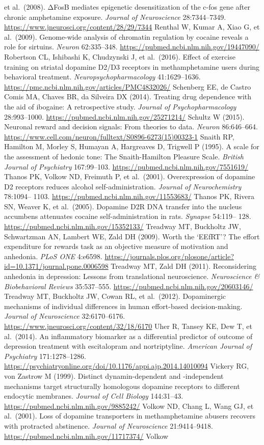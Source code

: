 et al.~(2008). ΔFosB mediates epigenetic desensitization of the c-fos gene after chronic amphetamine exposure. \emph{Journal of Neuroscience} 28:7344--7349. \url{https://www.jneurosci.org/content/28/29/7344} Renthal W, Kumar A, Xiao G, et al.~(2009). Genome-wide analysis of chromatin regulation by cocaine reveals a role for sirtuins. \emph{Neuron} 62:335--348. \url{https://pubmed.ncbi.nlm.nih.gov/19447090/} Robertson CL, Ishibashi K, Chudzynski J, et al.~(2016). Effect of exercise training on striatal dopamine D2/D3 receptors in methamphetamine users during behavioral treatment. \emph{Neuropsychopharmacology} 41:1629--1636. \url{https://pmc.ncbi.nlm.nih.gov/articles/PMC4832026/} Schenberg EE, de Castro Comis MA, Chaves BR, da Silveira DX (2014). Treating drug dependence with the aid of ibogaine: A retrospective study. \emph{Journal of Psychopharmacology} 28:993--1000. \url{https://pubmed.ncbi.nlm.nih.gov/25271214/} Schultz W (2015). Neuronal reward and decision signals: From theories to data. \emph{Neuron} 86:646--664. \url{https://www.cell.com/neuron/fulltext/S0896-6273(15)00323-1} Snaith RP, Hamilton M, Morley S, Humayan A, Hargreaves D, Trigwell P (1995). A scale for the assessment of hedonic tone: The Snaith-Hamilton Pleasure Scale. \emph{British Journal of Psychiatry} 167:99--103. \url{https://pubmed.ncbi.nlm.nih.gov/7551619/} Thanos PK, Volkow ND, Freimuth P, et al.~(2001). Overexpression of dopamine D2 receptors reduces alcohol self-administration. \emph{Journal of Neurochemistry} 78:1094-- 1103. \url{https://pubmed.ncbi.nlm.nih.gov/11553683/} Thanos PK, Rivera SN, Weaver K, et al.~(2005). Dopamine D2R DNA transfer into the nucleus accumbens attenuates cocaine self-administration in rats. \emph{Synapse} 54:119-- 128. \url{https://pubmed.ncbi.nlm.nih.gov/15352133/} Treadway MT, Buckholtz JW, Schwartzman AN, Lambert WE, Zald DH (2009). Worth the `EEfRT'? The effort expenditure for rewards task as an objective measure of motivation and anhedonia. \emph{PLoS ONE} 4:e6598. \url{https://journals.plos.org/plosone/article?id=10.1371/journal.pone.0006598} Treadway MT, Zald DH (2011). Reconsidering anhedonia in depression: Lessons from translational neuroscience. \emph{Neuroscience \& Biobehavioral Reviews} 35:537--555. \url{https://pubmed.ncbi.nlm.nih.gov/20603146/} Treadway MT, Buckholtz JW, Cowan RL, et al.~(2012). Dopaminergic mechanisms of individual differences in human effort-based decision-making. \emph{Journal of Neuroscience} 32:6170--6176. \url{https://www.jneurosci.org/content/32/18/6170} Uher R, Tansey KE, Dew T, et al.~(2014). An inflammatory biomarker as a differential predictor of outcome of depression treatment with escitalopram and nortriptyline. \emph{American Journal of Psychiatry} 171:1278--1286. \url{https://psychiatryonline.org/doi/10.1176/appi.ajp.2014.14010094} Vickery RG, von Zastrow M (1999). Distinct dynamin-dependent and -independent mechanisms target structurally homologous dopamine receptors to different endocytic membranes. \emph{Journal of Cell Biology} 144:31--43. \url{https://pubmed.ncbi.nlm.nih.gov/9885242/} Volkow ND, Chang L, Wang GJ, et al.~(2001). Loss of dopamine transporters in methamphetamine abusers recovers with protracted abstinence. \emph{Journal of Neuroscience} 21:9414--9418. \url{https://pubmed.ncbi.nlm.nih.gov/11717374/} Volkow 
